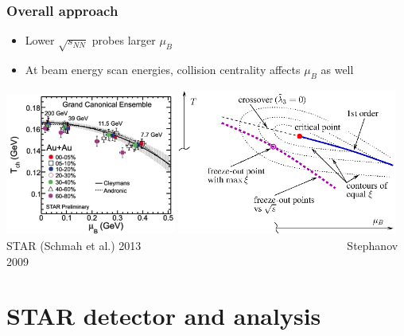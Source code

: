 \documentclass[accentcolor=tud2c,usenames,dvipsnames,colorbacktitle,inverttitle,landscape,german,presentation,t]{tudbeamer}
\begin{document}
  \begin{frame}
    \frametitle{Overall approach}
    \begin{itemize}
      \item Lower $\sqrt{s_{NN}}$ probes larger $\mu_B$
      \item At beam energy scan energies, collision centrality affects $\mu_B$
        as well
    \end{itemize}
    \begin{center}
      \includegraphics[width=0.42\textwidth]{figures/05/freezeout_diagram}
      \includegraphics[width=0.54\textwidth]{figures/05/critical_point_illustration}
      \\\footnotesize{STAR (Schmah et al.) 2013~~~~~~~~~~~~~~~~~~~~~~~~~~~~~~~~~~~~~Stephanov 2009}
    \end{center}
  \end{frame}


  \section{STAR detector and analysis}
\end{document}

